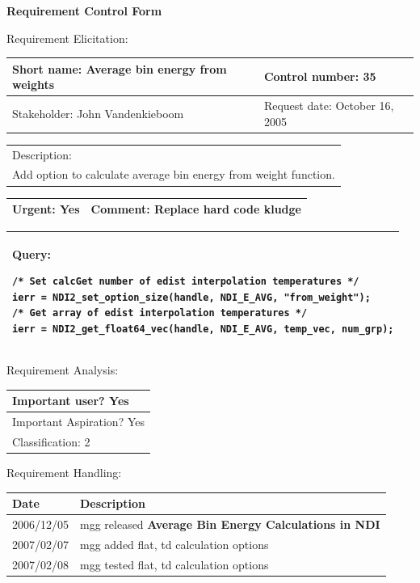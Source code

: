 \begin{center}\Large\bf
Requirement Control Form
\end{center}
\vspace{24pt}

Requirement Elicitation:

\begin{tabular}{|p{211pt}|p{211pt}|} \hline
Short name: Average bin energy from weights & Control number: 35\\ \hline
Stakeholder: John Vandenkieboom & Request date: October 16, 2005\\
\end{tabular}
\begin{tabular}{|p{433pt}|} \hline
Description: \\ 
Add option to calculate average bin energy from weight function.\\ \hline
\end{tabular}
\begin{tabular}{|p{211pt}|p{211pt}|} \hline
Urgent: Yes & Comment: Replace hard code kludge\\ \hline
\end{tabular}

\vspace{12pt}

\begin{tabular}{|p{433pt}|} \hline
Query: 
\begin{verbatim}
/* Set calcGet number of edist interpolation temperatures */
ierr = NDI2_set_option_size(handle, NDI_E_AVG, "from_weight");
/* Get array of edist interpolation temperatures */
ierr = NDI2_get_float64_vec(handle, NDI_E_AVG, temp_vec, num_grp);
\end{verbatim}
\\ \hline
\end{tabular}
\vspace{24pt}

Requirement Analysis:

\begin{tabular}{|p{433pt}|} \hline
Important user? Yes \\ \hline
Important Aspiration? Yes \\ \hline
Classification: 2 \\ \hline
\end{tabular}
\vspace{24pt}

Requirement Handling:

\begin{tabular}{|p{72pt}|p{351pt}|} \hline
Date & Description \\ \hline
2006/12/05 & mgg released \textbf{Average Bin Energy Calculations in
  NDI} \\ \hline
2007/02/07 & mgg added flat, td calculation options \\ \hline
2007/02/08 & mgg tested flat, td calculation options \\ \hline
\end{tabular}
